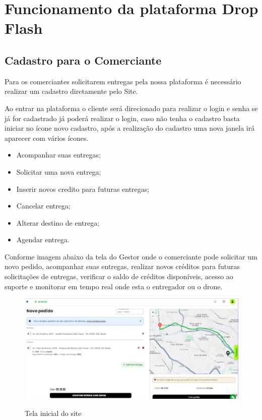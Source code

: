 \chapter{Funcionamento da plataforma Drop Flash}
\label{ch:identificador}

\section{Cadastro para o Comerciante}

Para os comerciantes solicitarem entregas pela nossa plataforma é necessário realizar um cadastro diretamente pelo Site.

Ao entrar na plataforma o cliente será direcionado para realizar o login e senha se já for cadastrado já poderá realizar o login, caso não tenha o cadastro basta iniciar no ícone novo cadastro, após a realização do cadastro uma nova janela irá aparecer com vários ícones.

\begin{itemize}
    \item Acompanhar suas entregas;
    \item Solicitar uma nova entrega;
    \item Inserir novos credito para futuras entregas;
    \item Cancelar entrega;
    \item Alterar destino de entrega;
    \item Agendar entrega.
\end{itemize}

Conforme imagem abaixo da tela do Gestor onde o comerciante pode solicitar um novo pedido, acompanhar suas entregas, realizar novos créditos para futuras solicitações de entregas, verificar o saldo de créditos disponíveis, acesso ao suporte e monitorar em tempo real onde esta o entregador ou o drone.\\

\begin{figure} [!ht]
  { \centering
    \caption{Tela inicial do site}
    \includegraphics[width=0.5\linewidth]{figuras/funcionamento1.png}
    \label{fig:enter-label}
    }
\end{figure}


